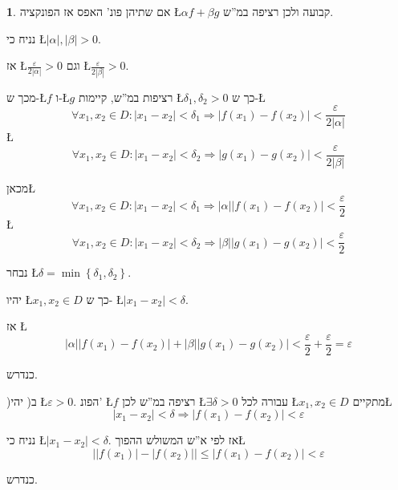 \documentclass[english,hebrew]{article}
\theoremstyle{plain}
\theoremstyle{definition}
\theoremstyle{definition}
\newtheorem*{sol*}{\protect\solutionname}
\providecommand{\solutionname}{פתרון}
\begin{document}
\begin{sol*}
אם שתיהן פונ' האפס אז הפונקציה \L{$\alpha f+\beta g$} קבועה ולכן
רציפה במ\textquotedblright ש.

נניח כי \L{$\left|\alpha\right|,\left|\beta\right|>0$}.

אז \L{$\frac{\varepsilon}{2\left|\alpha\right|}>0$} וגם \L{$\frac{\varepsilon}{2\left|\beta\right|}>0$}.

מכך ש-\L{$f$} ו-\L{$g$} רציפות במ\textquotedblright ש, קיימות \L{$\delta_{1},\delta_{2}>0$}
כך ש-\L{%
\[
\forall x_{1},x_{2}\in D:\left|x_{1}-x_{2}\right|<\delta_{1}\Rightarrow\left|f\left(x_{1}\right)-f\left(x_{2}\right)\right|<\frac{\varepsilon}{2\left|\alpha\right|}
\]
}%
\L{%
\[
\forall x_{1},x_{2}\in D:\left|x_{1}-x_{2}\right|<\delta_{2}\Rightarrow\left|g\left(x_{1}\right)-g\left(x_{2}\right)\right|<\frac{\varepsilon}{2\left|\beta\right|}
\]
}%

מכאן\L{%
\[
\forall x_{1},x_{2}\in D:\left|x_{1}-x_{2}\right|<\delta_{1}\Rightarrow\left|\alpha\right|\left|f\left(x_{1}\right)-f\left(x_{2}\right)\right|<\frac{\varepsilon}{2}
\]
}%
\L{%
\[
\forall x_{1},x_{2}\in D:\left|x_{1}-x_{2}\right|<\delta_{2}\Rightarrow\left|\beta\right|\left|g\left(x_{1}\right)-g\left(x_{2}\right)\right|<\frac{\varepsilon}{2}
\]
}%

נבחר \L{$\delta=\min\left\{ \delta_{1},\delta_{2}\right\} $}.

יהיו \L{$x_{1},x_{2}\in D$} כך ש- \L{$\left|x_{1}-x_{2}\right|<\delta$}.

אז \L{%
\[
\left|\alpha\right|\left|f\left(x_{1}\right)-f\left(x_{2}\right)\right|+\left|\beta\right|\left|g\left(x_{1}\right)-g\left(x_{2}\right)\right|<\frac{\varepsilon}{2}+\frac{\varepsilon}{2}=\varepsilon
\]
}%

כנדרש.

)ב( יהי \L{$\varepsilon>0$}. הפונ' \L{$f$} רציפה במ\textquotedblright ש
לכן \L{$\exists\delta>0$} עבורה לכל \L{$x_{1},x_{2}\in D$} מתקיים\L{%
\[
\left|x_{1}-x_{2}\right|<\delta\Rightarrow\left|f\left(x_{1}\right)-f\left(x_{2}\right)\right|<\varepsilon
\]
}%

נניח כי \L{$\left|x_{1}-x_{2}\right|<\delta$}. אז לפי א\textquotedblright ש
המשולש ההפוך\L{%
\[
\left|\left|f\left(x_{1}\right)\right|-\left|f\left(x_{2}\right)\right|\right|\le\left|f\left(x_{1}\right)-f\left(x_{2}\right)\right|<\varepsilon
\]
}%

כנדרש.
\end{sol*}
\end{document}
